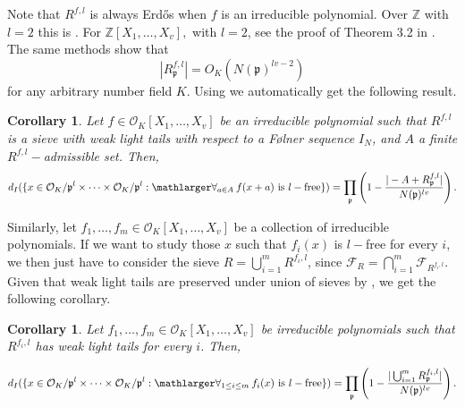 \documentclass[a4paper,11pt,reqno]{amsart}
\theoremstyle{plain}
\newtheorem{corollary}[theorem]{Corollary}
\theoremstyle{remark}
\newcommand{\z}{\mathbb{Z}}
\newcommand{\co}{\mathcal{O}}
\newcommand{\fr}{\mathcal{F}_R}
\newcommand{\gp}{\mathfrak{p}}
\begin{document}
				Note that $R^{f,l}$ is always Erdős when $f$ is an irreducible polynomial. Over $\z$ with $l =2$ this is . For $\z[X_1,\dots,X_v],$ with $l =2$, see the proof of Theorem 3.2 in \cite{Poone}. The same methods show that $$\left|R^{f,l}_\gp\right| = O_K(N(\gp)^{lv-2})$$ for any arbitrary number field $K$. Using  we automatically get the following result.
				
				\begin{corollary}
					\label{crl: admissible sets polynomials}
					Let $f \in \co_K[X_1,\dots, X_v]$ be an irreducible polynomial such that $R^{f,l}$ is a sieve with weak light tails with respect to a Følner sequence $I_N$, and $A$ a finite $R^{f,l}-$admissible set. Then, $$d_I(\{x \in \co_K/\gp^l \times \dots \times \co_K/\gp^l: \mathlarger\forall_{a \in A} \hspace{2pt} f(x+a) \text{ is } l-\text{free} \}) = \prod_{\gp} \left(1-\frac{|-A+R^{f,l}_\gp|}{N(\gp)^{lv}}\right).$$
				\end{corollary}
				
				Similarly, let $f_1 , \dots, f_m \in \co_K[X_1,\dots, X_v]$ be a collection of irreducible polynomials. If we want to study those $x$ such that $f_i(x)$ is $l-$free for every $i$, we then just have to consider the sieve $R = \bigcup_{i=1}^m R^{f_i,l}$, since $\fr =  \bigcap_{i=1}^m \mathcal{F}_{R^{f_i,l}}$. Given that weak light tails are preserved under union of sieves by , we get the following corollary. 
				
				\begin{corollary}
					\label{crl:intersection of squarefree values of polynomials}
					Let $f_1 , \dots, f_m \in \co_K[X_1,\dots, X_v]$ be irreducible polynomials such that $R^{f_i,l}$ has weak light tails for every $i$. Then, 
					
					$$d_I(\{x \in \co_K/\gp^l \times \dots \times \co_K/\gp^l:  \mathlarger\forall_{1\leq i \leq m} \hspace{2pt} f_i(x) \text{ is } l-\text{free} \}) = \prod_{\gp} \left(1-\frac{|\bigcup_{i=1}^m R^{f_i,l}_\gp|}{N(\gp)^{lv}}\right).$$
				\end{corollary}
				
\end{document}
